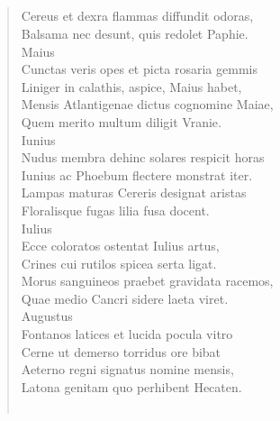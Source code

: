 \documentclass[11pt, a4paper]{report}
\begin{document}
            \subsection*{}
      \begin{verse}
      Cereus et dexra flammas diffundit odoras, \\ Balsama nec desunt, quis redolet Paphie. \\ Maius \\ Cunctas veris opes et picta rosaria gemmis \\ Liniger in calathis, aspice, Maius habet, \\ Mensis Atlantigenae dictus cognomine Maiae, \\ Quem merito multum diligit Vranie. \\ Iunius \\ Nudus membra dehinc solares respicit horas \\ Iunius ac Phoebum flectere monstrat iter. \\ Lampas maturas Cereris designat aristas \\ Floralisque fugas lilia fusa docent. \\ Iulius \\ Ecce coloratos ostentat Iulius artus, \\ Crines cui rutilos spicea serta ligat. \\ Morus sanguineos praebet gravidata racemos, \\ Quae medio Cancri sidere laeta viret. \\ Augustus \\ Fontanos latices et lucida pocula vitro \\ Cerne ut demerso torridus ore bibat \\ Aeterno regni signatus nomine mensis, \\ Latona genitam quo perhibent Hecaten. \\ 
        ﻿\pagebreak 

\end{verse}
\end{document}
